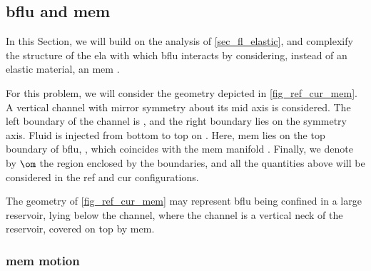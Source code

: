 
\subsection{\Acl{bflu} and \acl{mem}}\label{sec_fl_mem}

In this Section, we will build on the analysis of \cref{sec_fl_elastic}, and complexify the structure of the \acl{ela} with which \ac{bflu} interacts by considering, instead of an elastic material, an \ac{mem} \cite{helfrichElasticPropertiesLipid1973,derenyiFormationInteractionMembrane2002}.

For this problem, we will consider the  geometry depicted in \cref{fig_ref_cur_mem}. A vertical channel with mirror symmetry about its mid axis is considered. The left boundary of the channel is \pomin{}, and the right boundary \pomout{} lies on the symmetry axis. Fluid is injected from bottom to top on \pombottom. Here, \ac{mem} lies on the top boundary of \ac{bflu}, \pomtop{}, which  coincides with the \ac{mem} manifold \pomline{}. Finally, we denote by $\om$ the region enclosed by the boundaries, and all the quantities above will be considered in the \ac{ref} and \ac{cur} configurations.

The geometry of \cref{fig_ref_cur_mem} may represent \ac{bflu} being confined in a large reservoir, lying below the channel, where the channel is a vertical neck of the reservoir, covered on top by \ac{mem}.

\subsubsection{\Acl{mem} motion}
\label{sec_fl_mem_mem}

